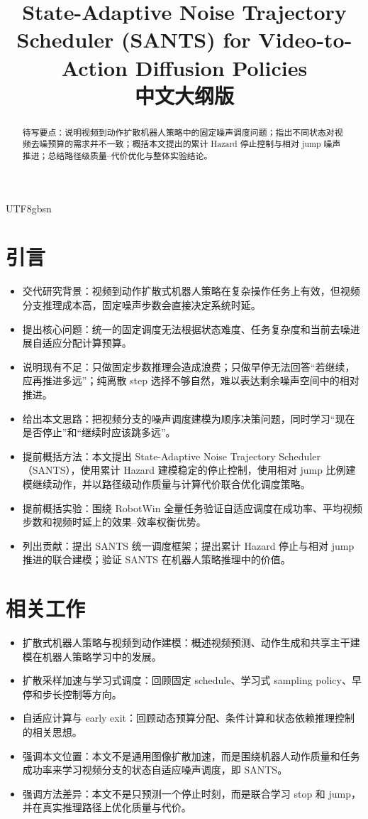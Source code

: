 \documentclass{article}
\title{State-Adaptive Noise Trajectory Scheduler (SANTS) for Video-to-Action Diffusion Policies\\中文大纲版}
\author{
}
\begin{document}
\begin{CJK*}{UTF8}{gbsn}

\maketitle

\begin{abstract}
待写要点：说明视频到动作扩散机器人策略中的固定噪声调度问题；指出不同状态对视频去噪预算的需求并不一致；概括本文提出的累计 Hazard 停止控制与相对 jump 噪声推进；总结路径级质量--代价优化与整体实验结论。
\end{abstract}


\section{引言}

\begin{itemize}
  \item 交代研究背景：视频到动作扩散式机器人策略在复杂操作任务上有效，但视频分支推理成本高，固定噪声步数会直接决定系统时延。
  \item 提出核心问题：统一的固定调度无法根据状态难度、任务复杂度和当前去噪进展自适应分配计算预算。
  \item 说明现有不足：只做固定步数推理会造成浪费；只做早停无法回答“若继续，应再推进多远”；纯离散 step 选择不够自然，难以表达剩余噪声空间中的相对推进。
  \item 给出本文思路：把视频分支的噪声调度建模为顺序决策问题，同时学习“现在是否停止”和“继续时应该跳多远”。
  \item 提前概括方法：本文提出 State-Adaptive Noise Trajectory Scheduler（SANTS），使用累计 Hazard 建模稳定的停止控制，使用相对 jump 比例建模继续动作，并以路径级动作质量与计算代价联合优化调度策略。
  \item 提前概括实验：围绕 RobotWin 全量任务验证自适应调度在成功率、平均视频步数和视频时延上的效果--效率权衡优势。
  \item 列出贡献：提出 SANTS 统一调度框架；提出累计 Hazard 停止与相对 jump 推进的联合建模；验证 SANTS 在机器人策略推理中的价值。
\end{itemize}

\section{相关工作}

\begin{itemize}
  \item 扩散式机器人策略与视频到动作建模：概述视频预测、动作生成和共享主干建模在机器人策略学习中的发展。
  \item 扩散采样加速与学习式调度：回顾固定 schedule、学习式 sampling policy、早停和步长控制等方向。
  \item 自适应计算与 early exit：回顾动态预算分配、条件计算和状态依赖推理控制的相关思想。
  \item 强调本文位置：本文不是通用图像扩散加速，而是围绕机器人动作质量和任务成功率来学习视频分支的状态自适应噪声调度，即 SANTS。
  \item 强调方法差异：本文不是只预测一个停止时刻，而是联合学习 stop 和 jump，并在真实推理路径上优化质量与代价。

\end{itemize}
\end{CJK*}
\end{document}
